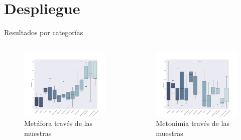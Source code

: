 \documentclass[presentation]{beamer}
\begin{document}
\section{Despliegue}
\label{sec:org7904323}
\begin{frame}[label={sec:org1adfccb}]{Resultados por categorías}
\begin{columns}
\begin{column}{0.48\columnwidth}
\begin{figure}[H]
\centering
\includegraphics[width=\linewidth]{./resultados/graphs/total/accum_cat_metafora.png}

\caption{Metáfora través de las muestras }
\end{figure}
\end{column}

\begin{column}{0.48\columnwidth}
\begin{figure}[H]
\includegraphics[width=\linewidth]{./resultados/graphs/total/accum_cat_metonimia.png}
\caption{Metonimia través de las muestras }
\centering

\end{figure}
\end{column}
\end{columns}
\end{frame}
\end{document}
